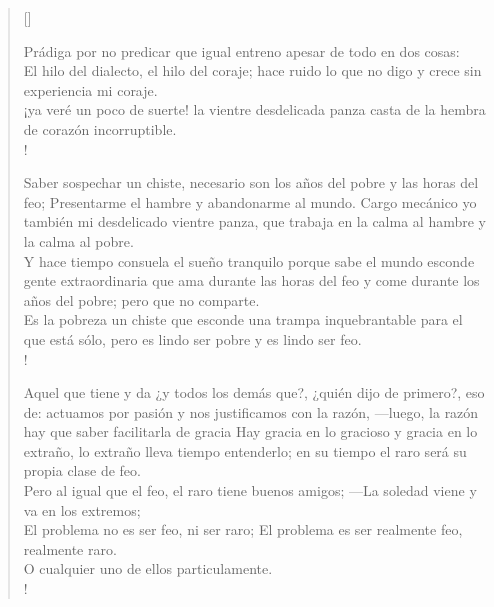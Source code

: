 \documentclass[11pt, a4paper]{article} %
\begin{document}

\settowidth{\versewidth}{Quiere mi tiempo libre la sutil, flexible dicha de buscarla, ------------------------------------------------------------------} %

\begin{verse}[\versewidth]
{\large
{\scriptsize

Prádiga por no predicar que igual entreno apesar de todo en dos cosas: \\
El hilo del dialecto, el hilo del coraje; hace ruido lo que no digo y crece sin experiencia mi coraje. \\
¡ya veré un poco de suerte! la vientre desdelicada panza casta de la hembra de corazón incorruptible. \\!


Saber sospechar un chiste, necesario son los años del pobre y las horas del feo; Presentarme el hambre y abandonarme al mundo. 
Cargo mecánico yo también mi desdelicado vientre panza, que trabaja en la calma al hambre y la calma al pobre. \\
Y hace tiempo consuela el sueño tranquilo porque sabe 
el mundo esconde gente extraordinaria que ama durante las horas del feo y come durante los años del pobre; pero que no comparte. \\ 
Es la pobreza un chiste que esconde una trampa inquebrantable para el que está sólo, pero es lindo ser pobre y es lindo ser feo. \\!

Aquel que tiene y da ¿y todos los demás que?, 
¿quién dijo de primero?, eso de: actuamos por pasión y nos justificamos con la razón, ---luego, la razón hay que saber facilitarla de gracia 
Hay gracia en lo gracioso y gracia en lo extraño, lo extraño lleva tiempo entenderlo; en su tiempo el raro será su propia clase de feo. \\
Pero al igual que el feo, el raro tiene buenos amigos; 
---La soledad viene y va en los extremos; \\
El problema no es ser feo, ni ser raro; El problema es ser realmente feo, realmente raro. \\
O cualquier uno de ellos particulamente. \\!

}}
\end{verse}
\end{document}
